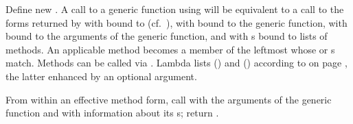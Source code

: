 \begin{LIST}{1cm}
  {
     Define new 
    . A call to a generic function using
     will be equivalent to a call to the forms returned by
     with  bound to
     (cf.\ ), with  bound to
    the generic function, with 
    bound to the arguments of the generic function, and with
    s bound to lists of methods. An applicable method becomes
    a member of the leftmost  whose  or
    s match. Methods can be called via
    . Lambda lists () and
    () according to
     on page \pageref{section:Functions}, the latter
    enhanced by an optional  argument.
  }

  {
    From within an effective method form, call  with the
    arguments of the generic function and
    with information about its s; return .
  }

\end{LIST}



